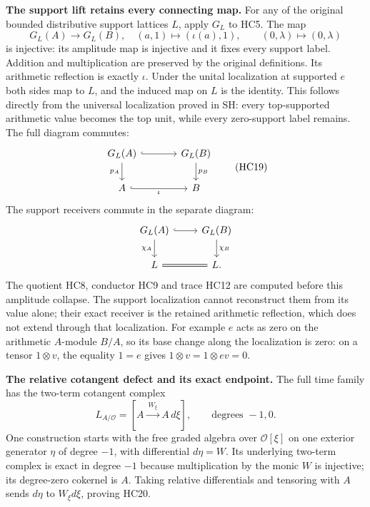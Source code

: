 \documentclass[11pt,a4paper]{article}
\theoremstyle{definition}\newtheorem{definition}[theorem]{Definition}
\begin{document}
\HC\textbf{The support lift retains every connecting map.}
For any of the original bounded distributive support lattices $L$,
apply $G_L$ to HC5. The map
\[
 G_L(A)\longrightarrow G_L(B),\quad
 (a,1)\longmapsto(\iota(a),1),\qquad
 (0,\lambda)\longmapsto(0,\lambda)
 \tag{HC18}
\]
is injective: its amplitude map is injective and it fixes every
support label. Addition and multiplication are preserved by the
original definitions. Its arithmetic reflection is exactly $\iota$.
Under the unital localization at supported $e$ both sides map to
$L$, and the induced map on $L$ is the identity. This follows
directly from the universal localization proved in SH: every
top-supported arithmetic value becomes the top unit, while every
zero-support label remains. The full diagram commutes:
\[
 \begin{tikzcd}[column sep=large]
 G_L(A)\arrow[r,hook]\arrow[d,"p_A"']
  &G_L(B)\arrow[d,"p_B"]\\
 A\arrow[r,hook,"\iota"']&B
 \end{tikzcd}
 \tag{HC19}
\]
The support receivers commute in the separate diagram:
\[
 \begin{tikzcd}
 G_L(A)\arrow[r,hook]\arrow[d,"\chi_A"']&
 G_L(B)\arrow[d,"\chi_B"]\\
 L\arrow[r,equal]&L.
 \end{tikzcd}
\]
The quotient HC8, conductor HC9 and trace HC12 are computed before
this amplitude collapse. The support localization cannot reconstruct
them from its value alone; their exact receiver is the retained
arithmetic reflection, which does not extend through that localization.
For example $e$ acts as zero on the arithmetic $A$-module $B/A$,
so its base change along the localization is zero: on a tensor
$1\otimes v$, the equality $1=e$ gives
$1\otimes v=1\otimes ev=0$.

\HC\textbf{The relative cotangent defect and its exact endpoint.}
The full time family has the two-term cotangent complex
\[
 L_{A/\mathcal O}=[A\xrightarrow{\ W_\xi\ }A\,d\xi],
       \qquad\text{degrees }-1,0.
 \tag{HC20}
\]
One construction starts with the free graded algebra over
$\mathcal O[\xi]$ on one exterior generator $\eta$ of degree $-1$,
with differential $d\eta=W$. Its underlying two-term complex is
exact in degree $-1$ because multiplication by the monic $W$ is
injective; its degree-zero cokernel is $A$. Taking relative
differentials and tensoring with $A$ sends $d\eta$ to
$W_\xi d\xi$, proving HC20.
\end{document}
